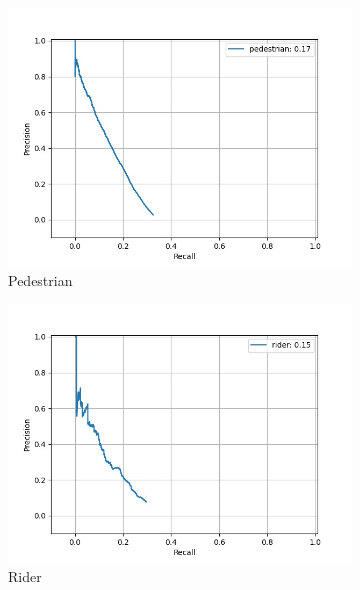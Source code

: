     \begin{figure}[H]
    	\centering
    	\begin{subfigure}[t]{0.325\textwidth}
    		\centering
    		\includegraphics[width=\textwidth]{images/bnn_pr/class_pedestrian_pr.jpg}
    		\caption{Pedestrian}
    	\end{subfigure}
    	\begin{subfigure}[t]{0.325\textwidth}
    		\centering
    		\includegraphics[width=\textwidth]{images/bnn_pr/class_rider_pr.jpg}
    		\caption{Rider}
    	\end{subfigure}
    	\begin{subfigure}[t]{0.325\textwidth}
    		\centering

\end{subfigure}
\end{figure}
